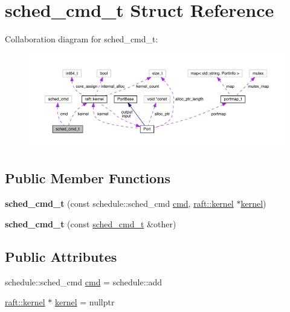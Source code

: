 \hypertarget{structsched__cmd__t}{}\section{sched\+\_\+cmd\+\_\+t Struct Reference}
\label{structsched__cmd__t}


Collaboration diagram for sched\+\_\+cmd\+\_\+t\+:
\nopagebreak
\begin{figure}[H]
\begin{center}
\leavevmode
\includegraphics[width=350pt]{structsched__cmd__t__coll__graph}
\end{center}
\end{figure}
\subsection*{Public Member Functions}
\begin{DoxyCompactItemize}
\item 
\hypertarget{structsched__cmd__t_a812b771fa21587d7b9888226e9ae0ce3}{}\label{structsched__cmd__t_a812b771fa21587d7b9888226e9ae0ce3} 
{\bfseries sched\+\_\+cmd\+\_\+t} (const schedule\+::sched\+\_\+cmd \hyperlink{structsched__cmd__t_ab4ecf8a7b468db75074c0ba1493caac7}{cmd}, \hyperlink{classraft_1_1kernel}{raft\+::kernel} $\ast$\hyperlink{structsched__cmd__t_a8f78af789430b7661f52de7365abcdbc}{kernel})
\item 
\hypertarget{structsched__cmd__t_a3a54e714aeba16cfe2faa5f2b082c8b8}{}\label{structsched__cmd__t_a3a54e714aeba16cfe2faa5f2b082c8b8} 
{\bfseries sched\+\_\+cmd\+\_\+t} (const \hyperlink{structsched__cmd__t}{sched\+\_\+cmd\+\_\+t} \&other)
\end{DoxyCompactItemize}
\subsection*{Public Attributes}
\begin{DoxyCompactItemize}
\item 
schedule\+::sched\+\_\+cmd \hyperlink{structsched__cmd__t_ab4ecf8a7b468db75074c0ba1493caac7}{cmd} = schedule\+::add
\item 
\hyperlink{classraft_1_1kernel}{raft\+::kernel} $\ast$ \hyperlink{structsched__cmd__t_a8f78af789430b7661f52de7365abcdbc}{kernel} = nullptr
\end{DoxyCompactItemize}



